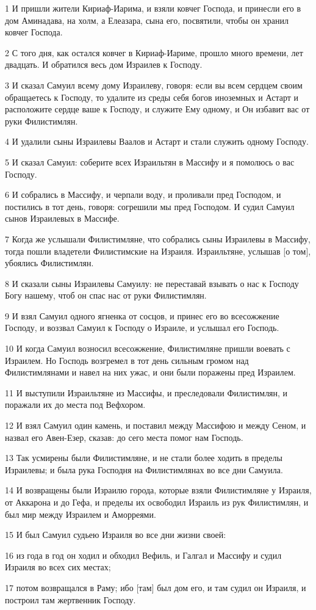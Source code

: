 \par 1 И пришли жители Кириаф-Иарима, и взяли ковчег Господа, и принесли его в дом Аминадава, на холм, а Елеазара, сына его, посвятили, чтобы он хранил ковчег Господа.
\par 2 С того дня, как остался ковчег в Кириаф-Иариме, прошло много времени, лет двадцать. И обратился весь дом Израилев к Господу.
\par 3 И сказал Самуил всему дому Израилеву, говоря: если вы всем сердцем своим обращаетесь к Господу, то удалите из среды себя богов иноземных и Астарт и расположите сердце ваше к Господу, и служите Ему одному, и Он избавит вас от руки Филистимлян.
\par 4 И удалили сыны Израилевы Ваалов и Астарт и стали служить одному Господу.
\par 5 И сказал Самуил: соберите всех Израильтян в Массифу и я помолюсь о вас Господу.
\par 6 И собрались в Массифу, и черпали воду, и проливали пред Господом, и постились в тот день, говоря: согрешили мы пред Господом. И судил Самуил сынов Израилевых в Массифе.
\par 7 Когда же услышали Филистимляне, что собрались сыны Израилевы в Массифу, тогда пошли владетели Филистимские на Израиля. Израильтяне, услышав [о том], убоялись Филистимлян.
\par 8 И сказали сыны Израилевы Самуилу: не переставай взывать о нас к Господу Богу нашему, чтоб он спас нас от руки Филистимлян.
\par 9 И взял Самуил одного ягненка от сосцов, и принес его во всесожжение Господу, и воззвал Самуил к Господу о Израиле, и услышал его Господь.
\par 10 И когда Самуил возносил всесожжение, Филистимляне пришли воевать с Израилем. Но Господь возгремел в тот день сильным громом над Филистимлянами и навел на них ужас, и они были поражены пред Израилем.
\par 11 И выступили Израильтяне из Массифы, и преследовали Филистимлян, и поражали их до места под Вефхором.
\par 12 И взял Самуил один камень, и поставил между Массифою и между Сеном, и назвал его Авен-Езер, сказав: до сего места помог нам Господь.
\par 13 Так усмирены были Филистимляне, и не стали более ходить в пределы Израилевы; и была рука Господня на Филистимлянах во все дни Самуила.
\par 14 И возвращены были Израилю города, которые взяли Филистимляне у Израиля, от Аккарона и до Гефа, и пределы их освободил Израиль из рук Филистимлян, и был мир между Израилем и Аморреями.
\par 15 И был Самуил судьею Израиля во все дни жизни своей:
\par 16 из года в год он ходил и обходил Вефиль, и Галгал и Массифу и судил Израиля во всех сих местах;
\par 17 потом возвращался в Раму; ибо [там] был дом его, и там судил он Израиля, и построил там жертвенник Господу.

